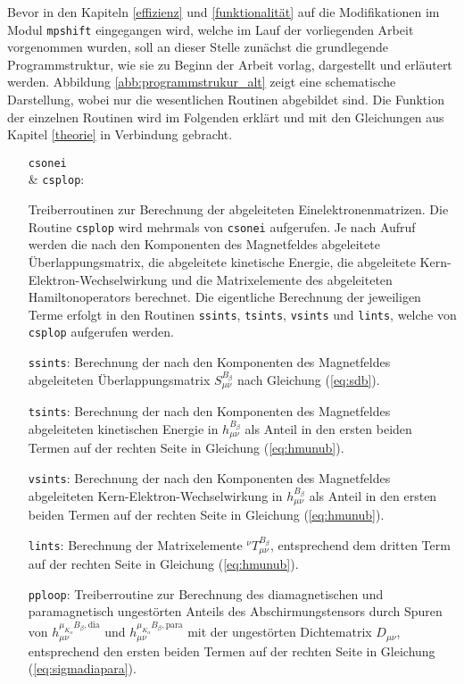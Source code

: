 Bevor in den Kapiteln \ref{effizienz} und \ref{funktionalität} auf die Modifikationen im Modul \texttt{mpshift} eingegangen wird, welche im Lauf der vorliegenden Arbeit vorgenommen wurden, soll an dieser Stelle zunächst die grundlegende Programmstruktur, wie sie zu Beginn der Arbeit vorlag, dargestellt und erläutert werden. Abbildung \ref{abb:programmstrukur_alt} zeigt eine schematische Darstellung, wobei nur die wesentlichen Routinen abgebildet sind. Die Funktion der einzelnen Routinen wird im Folgenden erklärt und mit den Gleichungen aus Kapitel \ref{theorie} in Verbindung gebracht. 

\begin{itemize}[leftmargin=60pt]
\item[{\parbox[t]{0.145\linewidth}{\texttt{csonei} \\ \& \texttt{csplop}:}}]\parbox[t]{1\linewidth}{Treiberroutinen zur Berechnung der abgeleiteten Einelektronenmatrizen. Die Routine \texttt{csplop} wird mehrmals von \texttt{csonei} aufgerufen. Je nach Aufruf werden die nach den Komponenten des Magnetfeldes abgeleitete Überlappungsmatrix, die abgeleitete kinetische Energie, die abgeleitete Kern-Elektron-Wechselwirkung und die Matrixelemente des abgeleiteten Hamiltonoperators berechnet. Die eigentliche Berechnung der jeweiligen Terme erfolgt in den Routinen \texttt{ssints}, \texttt{tsints}, \texttt{vsints} und \texttt{lints}, welche von \texttt{csplop} aufgerufen werden.}
\item[\texttt{ssints}:] Berechnung der nach den Komponenten des Magnetfeldes abgeleiteten Überlappungsmatrix $S_{\mu\nu}^{B_\beta}$ nach Gleichung (\ref{eq:sdb}).
\item[\texttt{tsints}:] Berechnung der nach den Komponenten des Magnetfeldes abgeleiteten kinetischen Energie in $h_{\mu\nu}^{B_\beta}$ als Anteil in den ersten beiden Termen auf der rechten Seite in Gleichung (\ref{eq:hmunub}).
\item[\texttt{vsints}:] Berechnung der nach den Komponenten des Magnetfeldes abgeleiteten Kern-Elektron-Wechselwirkung in $h_{\mu\nu}^{B_\beta}$ als Anteil in den ersten beiden Termen auf der rechten Seite in Gleichung (\ref{eq:hmunub}).
\item[\texttt{lints}:] Berechnung der Matrixelemente $^{\nu}T_{\mu\nu}^{B_\beta}$, entsprechend dem dritten Term auf der rechten Seite in Gleichung (\ref{eq:hmunub}).
\item[\texttt{pploop}:] Treiberroutine zur Berechnung des diamagnetischen und paramagnetisch ungestörten Anteils des Abschirmungstensors durch Spuren von $h_{\mu\nu}^{\mu_{K_\alpha}B_\beta,\textrm{dia}}$ und $h_{\mu\nu}^{\mu_{K_\alpha}B_\beta,\textrm{para}}$ mit der ungestörten Dichtematrix $D_{\mu\nu}$, entsprechend den ersten beiden Termen auf der rechten Seite in Gleichung (\ref{eq:sigmadiapara}). 

\end{itemize}
